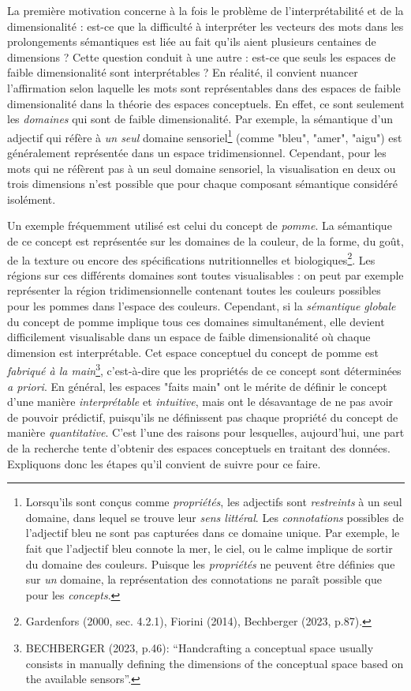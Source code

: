 \documentclass{article}
\begin{document}
\par
La première motivation concerne à la fois le problème de l’interprétabilité et de la dimensionalité : est-ce que la difficulté à interpréter les vecteurs des mots dans les prolongements sémantiques est liée au fait qu’ils aient plusieurs centaines de dimensions ? Cette question conduit à une autre : est-ce que seuls les espaces de faible dimensionalité sont interprétables ? En réalité, il convient nuancer l'affirmation selon laquelle les mots sont représentables dans des espaces de faible dimensionalité dans la théorie des espaces conceptuels. En effet, ce sont seulement les \textit{domaines} qui sont de faible dimensionalité. Par exemple, la sémantique d’un adjectif qui réfère à \textit{un seul} domaine sensoriel\footnote{Lorsqu’ils sont conçus comme \textit{propriétés}, les adjectifs sont \textit{restreints} à un seul domaine, dans lequel se trouve leur \textit{sens littéral}. Les  \textit{connotations} possibles de l’adjectif  \og bleu \fg ne sont pas capturées dans ce domaine unique. Par exemple, le fait que l’adjectif \og bleu \fg connote la mer, le ciel, ou le calme implique de sortir du domaine des couleurs. Puisque les \textit{propriétés} ne peuvent être définies que sur \textit{un} domaine, la représentation des connotations ne paraît possible que pour les \textit{concepts}.} (comme "bleu", "amer", "aigu") est généralement représentée dans un espace tridimensionnel. Cependant, pour les mots qui ne réfèrent pas à un seul domaine sensoriel, la visualisation en deux ou trois dimensions n’est possible que pour chaque composant sémantique considéré isolément.
\par
Un exemple fréquemment utilisé est celui du concept de \textit{pomme}. La sémantique de ce concept est représentée sur les domaines de la couleur, de la forme, du goût, de la texture ou encore des spécifications nutritionnelles et biologiques\footnote{Gardenfors (2000, sec. 4.2.1), Fiorini (2014), Bechberger (2023, p.87).}. Les régions sur ces différents domaines sont toutes visualisables : on peut par exemple représenter la région tridimensionnelle contenant toutes les couleurs possibles pour les pommes dans l’espace des couleurs. Cependant, si la \textit{sémantique globale} du concept de pomme implique tous ces domaines simultanément, elle devient difficilement visualisable dans un espace de faible dimensionalité où chaque dimension est interprétable. Cet espace conceptuel du concept de pomme est \textit{fabriqué à la main}\footnote{BECHBERGER (2023, p.46): “Handcrafting a conceptual space usually consists in manually defining the dimensions of the conceptual space based on the available sensors”.}, c'est-à-dire que les propriétés de ce concept sont déterminées \textit{a priori}. En général, les espaces "faits main" ont le mérite de définir le concept d’une manière \textit{interprétable} et \textit{intuitive}, mais ont le désavantage de ne pas avoir de pouvoir prédictif, puisqu’ils ne définissent pas chaque propriété du concept de manière \textit{quantitative}. C’est l’une des raisons pour lesquelles, aujourd’hui, une part de la recherche tente d’obtenir des espaces conceptuels en traitant des données. Expliquons donc les étapes qu’il convient de suivre pour ce faire.
\end{document}
